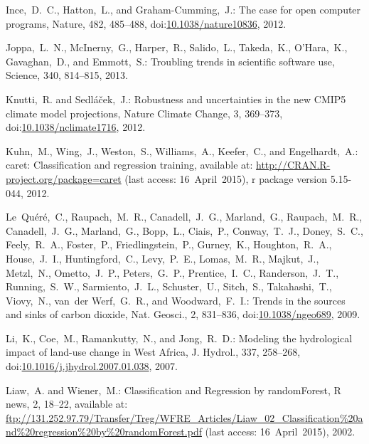 \documentclass[gmdd, online, hvmath]{copernicus}
\begin{document}
\begin{thebibliography}{97}
 Ince,~D.~C., Hatton,~L., and
  {Graham-Cumming},~J.: The case for open computer programs, Nature,
  482, 485--488,
doi:\href{http://dx.doi.org/10.1038/nature10836}{10.1038/nature10836}, 2012.


  Joppa,~L.~N., {McInerny},~G., Harper,~R., Salido,~L., Takeda,~K.,
  {O'Hara},~K., Gavaghan,~D., and Emmott,~S.:
  Troubling trends in scientific software use, Science, 340, 814--815,
  2013.


 Knutti,~R.
  and Sedl\'{a}\v{c}ek,~J.: Robustness and uncertainties in the new
  {CMIP5} climate model projections, Nature Climate
  Change, 3, 369--373,
  doi:\href{http://dx.doi.org/10.1038/nclimate1716}{10.1038/nclimate1716}, 2012.


 Kuhn,~M., Wing,~J., Weston,~S.,
  Williams,~A., Keefer,~C., and Engelhardt,~A.: caret: Classification
  and regression training, available at:
  \url{http://CRAN.R-project.org/package=caret} (last
  access: 16~April~2015), r package
  version 5.15-044, 2012.


  Le~Qu\'{e}r\'{e},~C., Raupach,~M.~R., Canadell,~J.~G., Marland,~G.,
  Raupach,~M.~R., Canadell,~J.~G., Marland,~G., Bopp,~L., Ciais,~P.,
  Conway,~T.~J., Doney,~S.~C., Feely,~R.~A., Foster,~P.,
  Friedlingstein,~P., Gurney,~K., Houghton,~R.~A., House,~J.~I.,
  Huntingford,~C., Levy,~P.~E., Lomas,~M.~R., Majkut,~J., Metzl,~N.,
  Ometto,~J.~P., Peters,~G.~P., Prentice,~I.~C., Randerson,~J.~T.,
  Running,~S.~W., Sarmiento,~J.~L., Schuster,~U., Sitch,~S.,
  Takahashi,~T., Viovy,~N., van~der Werf,~G.~R., and
  Woodward,~F.~I.:
  Trends in the sources and sinks of carbon dioxide, Nat. Geosci., 2,
  831--836,
doi:\href{http://dx.doi.org/10.1038/ngeo689}{10.1038/ngeo689}, 2009.


  Li,~K., Coe,~M., Ramankutty,~N., and Jong,~R.~D.: Modeling the
  hydrological impact of land-use change in West Africa, J. Hydrol.,
  337, 258--268,
doi:\href{http://dx.doi.org/10.1016/j.jhydrol.2007.01.038}{10.1016/j.jhydrol.2007.01.038}, 2007. %


 Liaw,~A. and Wiener,~M.:
  Classification and Regression by {randomForest}, R news, 2, 18--22,
  available at:
  \url{ftp://131.252.97.79/Transfer/Treg/WFRE_Articles/Liaw_02_Classification\%20and\%20regression\%20by\%20randomForest.pdf}
  (last access: 16~April~2015), 2002.



\end{thebibliography}
\end{document}
